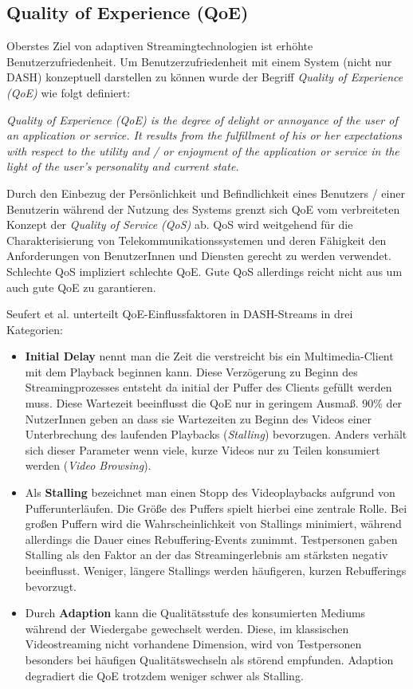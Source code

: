 \documentclass[paper = a4, fontsize = 12pt, parskip = half]{scrartcl} %
\begin{document}
\subsection{Quality of Experience (QoE)}
Oberstes Ziel von adaptiven Streamingtechnologien ist erhöhte Benutzerzufriedenheit. Um Benutzerzufriedenheit mit einem System (nicht nur DASH) konzeptuell darstellen zu können wurde der Begriff \textit{Quality of Experience (QoE)} wie folgt definiert:

\glqq \textit{Quality of Experience (QoE) is the degree of delight or annoyance of the user of an application or service. It results from the fulfillment of his or her expectations with respect to the utility and / or enjoyment of the application or service in the light of the user’s personality and current state.}\grqq \cite{brunnstrom_qualinet_2013}

Durch den Einbezug der Persönlichkeit und Befindlichkeit eines Benutzers / einer Benutzerin während der Nutzung des Systems grenzt sich QoE vom verbreiteten Konzept der \textit{Quality of Service (QoS)} ab. QoS wird weitgehend für die Charakterisierung von Telekommunikationssystemen und deren Fähigkeit den Anforderungen von BenutzerInnen und Diensten gerecht zu werden verwendet. Schlechte QoS impliziert schlechte QoE. Gute QoS allerdings reicht nicht aus um auch gute QoE zu garantieren.

Seufert et al. \cite{seufert_survey_2015} unterteilt QoE-Einflussfaktoren in DASH-Streams in drei Kategorien:
\begin{itemize}
	\item \textbf{Initial Delay} nennt man die Zeit die verstreicht bis ein Multimedia-Client mit dem Playback beginnen kann. Diese Verzögerung zu Beginn des Streamingprozesses entsteht da initial der Puffer des Clients gefüllt werden muss. Diese Wartezeit beeinflusst die QoE nur in geringem Ausmaß. 90\% der NutzerInnen geben an dass sie Wartezeiten zu Beginn des Videos einer Unterbrechung des laufenden Playbacks (\textit{Stalling}) bevorzugen. Anders verhält sich dieser Parameter wenn viele, kurze Videos nur zu Teilen konsumiert werden (\textit{Video Browsing}).
	\item Als \textbf{Stalling} bezeichnet man einen Stopp des Videoplaybacks aufgrund von Pufferunterläufen. Die Größe des Puffers spielt hierbei eine zentrale Rolle. Bei großen Puffern wird die Wahrscheinlichkeit von Stallings minimiert, während allerdings die Dauer eines Rebuffering-Events zunimmt. Testpersonen gaben Stalling als den Faktor an der das Streamingerlebnis am stärksten negativ beeinflusst. Weniger, längere Stallings werden häufigeren, kurzen Rebufferings bevorzugt.
	\item Durch \textbf{Adaption} kann die Qualitätsstufe des konsumierten Mediums während der Wiedergabe gewechselt werden. Diese, im klassischen Videostreaming nicht vorhandene Dimension, wird von Testpersonen besonders bei häufigen Qualitätswechseln als störend empfunden. Adaption degradiert die QoE trotzdem weniger schwer als Stalling.
\end{itemize}
\end{document}

